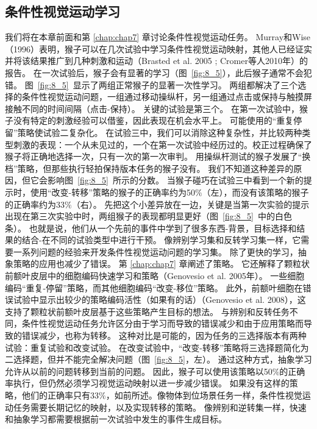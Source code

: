 \subsection{条件性视觉运动学习}

我们将在本章前面和第 \ref{chap:chap7} 章讨论条件性视觉运动任务。
Murray和Wise（1996）表明，猴子可以在几次试验中学习条件性视觉运动映射，其他人已经证实并将该结果推广到几种刺激和运动（Brasted et al. 2005 ; Cromer等人2010年）的报告。
在一次试验后，猴子会有显著的学习（图~\ref{fig:8_5}），此后猴子通常不会犯错。
图~\ref{fig:8_5}~显示了两组正常猴子的显著一次性学习。
两组都解决了三个选择的条件性视觉运动问题，一组通过移动操纵杆，另一组通过点击或保持与触摸屏接触不同的时间间隔（点击-保持）。
关键的试验是第三个。
在第一次试验中，猴子没有特定的刺激经验可以借鉴，因此表现在机会水平上。
可能使用的“重复停留”策略使试验二复杂化。
在试验三中，我们可以消除这种复杂性，并比较两种类型刺激的表现：一个从未见过的，一个在第一次试验中经历过的。校正过程确保了猴子将正确地选择一次，只有一次的第一次审判。
用操纵杆测试的猴子发展了“换档”策略，但那些执行轻拍保持版本任务的猴子没有。
我们不知道这种差异的原因，但它会影响图~\ref{fig:8_5}~所示的分数。
当猴子碰巧在试验三中看到一个新的提示时，使用“改变-转移”策略的猴子的正确率约为50$\%$（左），而没有该策略的猴子的正确率约为33$\%$（右）。
先把这个小差异放在一边，关键是当第一次实验的提示出现在第三次实验中时，两组猴子的表现都明显更好（图~\ref{fig:8_5}~中的白色条）。
也就是说，他们从一个先前的事件中学到了很多东西-背景，目标选择和结果的结合-在不同的试验类型中进行干预。
像辨别学习集和反转学习集一样，它需要一系列问题的经验来开发条件性视觉运动问题的学习集。
除了更快的学习，抽象策略的应用也减少了错误。
第 \ref{chap:chap7} 章阐述了策略。
它还解释了颗粒状前额叶皮层中的细胞编码快速学习和策略（Genovesio et al. 2005年）。
一些细胞编码“重复-停留”策略，而其他细胞编码“改变-移位”策略。
此外，前额叶细胞在错误试验中显示出较少的策略编码活性（如果有的话）（Genovesio et al. 2008），这支持了颗粒状前额叶皮层基于这些策略产生目标的想法。
与辨别和反转任务不同，条件性视觉运动任务允许区分由于学习而导致的错误减少和由于应用策略而导致的错误减少，也称为转移。
这种对比是可能的，因为任务的三选择版本有两种试验：重复试验和改变试验。
在改变试验中，“改变-转移”策略将三选择题简化为二选择题，但并不能完全解决问题（图~\ref{fig:8_5}，左）。
通过这种方式，抽象学习允许从以前的问题转移到当前的问题。
因此，猴子可以使用该策略以50$\%$的正确率执行，但仍然必须学习视觉运动映射以进一步减少错误。
如果没有这样的策略，他们的正确率只有33$\%$，如前所述。像物体到位场景任务一样，条件性视觉运动任务需要长期记忆的映射，以及实现转移的策略。
像辨别和逆转集一样，快速和抽象学习都需要根据前一次试验中发生的事件生成目标。
